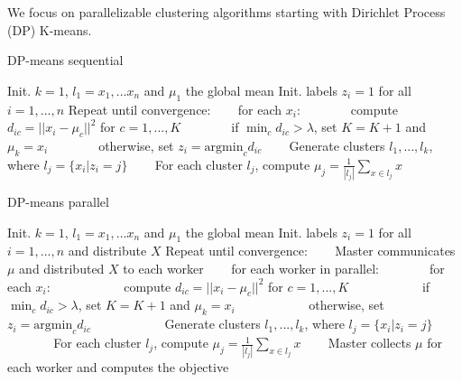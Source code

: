 We focus on parallelizable clustering algorithms starting with Dirichlet Process (DP) K-means.

\begin{algorithm}
\caption{DP-means sequential}
\label{alg:dpmeans1}
\begin{algorithmic}[1]
\STATE Init. $k = 1$, $l_1={x_1,...x_n}$ and $\mu_1$ the global mean
\STATE Init. labels $z_i=1$ for all $i=1,...,n$
\STATE Repeat until convergence:
\STATE ~~~ for each $x_i$: 
\STATE ~~~ ~~~ compute $d_{ic} = ||x_i-\mu_c||^{2}$ for $c=1,...,K$
\STATE ~~~ ~~~ if $\min_c d_{ic} > \lambda$, set $K=K+1$ and $\mu_k = x_i$
\STATE ~~~ ~~~ otherwise, set $z_i = \mathrm{argmin}_c d_{ic}$
\STATE ~~~ Generate clusters $l_1,...,l_k$, where $l_j=\{x_i|z_i=j\}$
\STATE ~~~ For each cluster $l_j$, compute $\mu_j = \frac{1}{|l_j|}\sum_{x\in l_j} x$
\end{algorithmic}
\end{algorithm}


\begin{algorithm}
\caption{DP-means parallel}
\label{alg:dpmeans1}
\begin{algorithmic}[1]
\STATE Init. $k = 1$, $l_1={x_1,...x_n}$ and $\mu_1$ the global mean
\STATE Init. labels $z_i=1$ for all $i=1,...,n$ and distribute $X$
\STATE Repeat until convergence:
\STATE ~~~ Master communicates $\mu$ and distributed $X$ to each worker
\STATE ~~~ for each worker in parallel:
\STATE ~~~ ~~~ for each $x_i$: 
\STATE ~~~ ~~~ ~~~ compute $d_{ic} = ||x_i-\mu_c||^{2}$ for $c=1,...,K$
\STATE ~~~ ~~~ ~~~ if $\min_c d_{ic} > \lambda$, set $K=K+1$ and $\mu_k = x_i$
\STATE ~~~ ~~~ ~~~ otherwise, set $z_i = \mathrm{argmin}_c d_{ic}$
\STATE ~~~ ~~~ ~~~ Generate clusters $l_1,...,l_k$, where $l_j=\{x_i|z_i=j\}$
\STATE ~~~ ~~~ ~~~ For each cluster $l_j$, compute $\mu_j = \frac{1}{|l_j|}\sum_{x\in l_j} x$
\STATE ~~~ Master collects $\mu$ for each worker and computes the objective
\end{algorithmic}
\end{algorithm}


